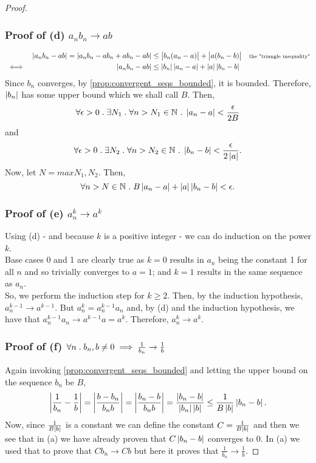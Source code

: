 \documentclass[../MathsNotesBase.tex]{subfiles}
\begin{document}
{\begin{proof}
			\subsubsection{Proof of (d) $ a_nb_n \to ab $}
			\begin{align*}
			&& \left\lvert a_nb_n - ab\right\rvert = \left\lvert a_nb_n - ab_n + ab_n - ab\right\rvert &\leq \left\lvert b_n(a_n - a)\right\rvert + \left\lvert a(b_n - b)\right\rvert  &\text{\scriptsize{the "triangle inequality"}}\\
			&\iff & \left\lvert a_nb_n - ab\right\rvert &\leq \left\lvert b_n\right\rvert\left\lvert a_n - a\right\rvert + \left\lvert a\right\rvert\left\lvert b_n - b\right\rvert  &\text{\scriptsize{}} \\
			\end{align*}
			Since $b_n$ converges, by \autoref{prop:convergent_seqs_bounded}, it is bounded. Therefore, $\left\lvert b_n\right\rvert$ has some upper bound which we shall call $B$. Then,
			\[ \forall \epsilon > 0 \;.\; \exists N_1 \;.\; \forall n > N_1 \in \mathbb{N}^{} \;.\; \left\lvert a_n - a\right\rvert < \frac{\epsilon}{2B} \]
			and
			\[ \forall \epsilon > 0 \;.\; \exists N_2 \;.\; \forall n > N_2 \in \mathbb{N}^{} \;.\; \left\lvert b_n - b\right\rvert < \frac{\epsilon}{2\left\lvert a\right\rvert}. \]
			Now, let ${ N = max{N_1, N_2}. }$ Then,
			\[ \forall n > N \in \mathbb{N}^{} \;.\; B\left\lvert a_n - a\right\rvert + \left\lvert a\right\rvert\left\lvert b_n - b\right\rvert < \epsilon. \]
			
			\subsubsection{Proof of (e) $ a_n^k \to a^k $}
			Using (d) - and because $k$ is a positive integer - we can do induction on the power $k$.\\
			Base cases 0 and 1 are clearly true as ${ k = 0 }$ results in $a_n$ being the constant 1 for all $n$ and so trivially converges to ${ a = 1 }$; and ${ k = 1 }$ results in the same sequence as $a_n$.\\
			So, we perform the induction step for ${ k \geq 2 }$. Then, by the induction hypothesis, ${ a_n^{k-1} \to a^{k-1} }$. But ${ a_n^k = a_n^{k-1}a_n }$ and, by (d) and the induction hypothesis, we have that ${ a_n^{k-1}a_n \to a^{k-1}a = a^k }$. Therefore, ${ a_n^k \to a^k. }$
			
			\subsubsection{Proof of (f) $ \forall n \;.\; b_n, b \neq 0 \implies \frac{1}{b_n} \to \frac{1}{b} $}
			Again invoking \autoref{prop:convergent_seqs_bounded} and letting the upper bound on the sequence $b_n$ be $B$,
			\[ \left\lvert\frac{1}{b_n} - \frac{1}{b}\right\rvert = \left\lvert\frac{b - b_n}{b_nb}\right\rvert = \left\lvert\frac{b_n - b}{b_nb}\right\rvert = \frac{ \left\lvert b_n - b\right\rvert }{ \left\lvert b_n\right\rvert\left\lvert b\right\rvert } \leq \frac{1}{B\left\lvert b\right\rvert}\left\lvert b_n - b\right\rvert. \]
			Now, since $\frac{1}{B\left\lvert b\right\rvert}$ is a constant we can define the constant ${ C = \frac{1}{B\left\lvert b\right\rvert} }$ and then we see that in (a) we have already proven that ${ C\left\lvert b_n - b\right\rvert }$ converges to 0. In (a) we used that to prove that ${ Cb_n \to Cb }$ but here it proves that ${ \frac{1}{b_n} \to \frac{1}{b}. }$
		\end{proof}
	}
\end{document}
